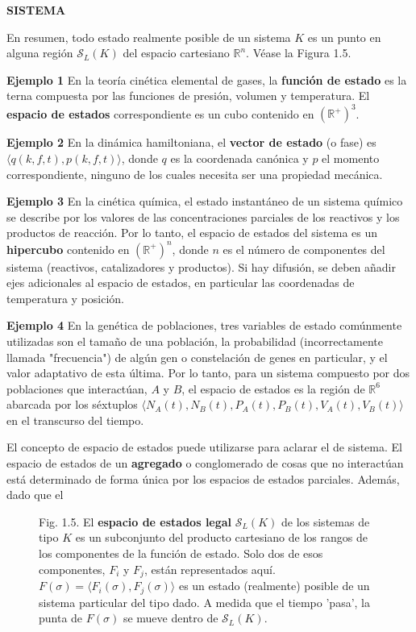 \fancyhf{}
\fancyhead[r]{\thepage}
\begin{center}
{\fontsize{16}{18}\selectfont \textbf{SISTEMA}}
\end{center}
\vspace{0.5cm}

{\fontsize{13}{15}\selectfont
En resumen, todo estado realmente posible de un sistema $K$ es un punto en alguna región $\mathcal{S}_L(K)$ del espacio cartesiano $\mathbb{R}^n$. Véase la Figura 1.5.

\textbf{Ejemplo 1} En la teoría cinética elemental de gases, la \textbf{función de estado} es la terna compuesta por las funciones de presión, volumen y temperatura. El \textbf{espacio de estados} correspondiente es un cubo contenido en $(\mathbb{R}^+)^3$.

\textbf{Ejemplo 2} En la dinámica hamiltoniana, el \textbf{vector de estado} (o fase) es $\langle q(k, f, t), p(k, f, t) \rangle$, donde $q$ es la coordenada canónica y $p$ el momento correspondiente, ninguno de los cuales necesita ser una propiedad mecánica.

\textbf{Ejemplo 3} En la cinética química, el estado instantáneo de un sistema químico se describe por los valores de las concentraciones parciales de los reactivos y los productos de reacción. Por lo tanto, el espacio de estados del sistema es un \textbf{hipercubo} contenido en $(\mathbb{R}^+)^n$, donde $n$ es el número de componentes del sistema (reactivos, catalizadores y productos). Si hay difusión, se deben añadir ejes adicionales al espacio de estados, en particular las coordenadas de temperatura y posición.

\textbf{Ejemplo 4} En la genética de poblaciones, tres variables de estado comúnmente utilizadas son el tamaño de una población, la probabilidad (incorrectamente llamada "frecuencia") de algún gen o constelación de genes en particular, y el valor adaptativo de esta última. Por lo tanto, para un sistema compuesto por dos poblaciones que interactúan, $A$ y $B$, el espacio de estados es la región de $\mathbb{R}^6$ abarcada por los séxtuplos $\langle N_A(t), N_B(t), P_A(t), P_B(t), V_A(t), V_B(t) \rangle$ en el transcurso del tiempo.

El concepto de espacio de estados puede utilizarse para aclarar el de sistema. El espacio de estados de un \textbf{agregado} o conglomerado de cosas que no interactúan está determinado de forma única por los espacios de estados parciales. Además, dado que el

\begin{figure}[h!]
    \centering
    \caption*{Fig. 1.5. El \textbf{espacio de estados legal} $\mathcal{S}_L(K)$ de los sistemas de tipo $K$ es un subconjunto del producto cartesiano de los rangos de los componentes de la función de estado. Solo dos de esos componentes, $F_i$ y $F_j$, están representados aquí. $F(\sigma) = \langle F_i(\sigma), F_j(\sigma) \rangle$ es un estado (realmente) posible de un sistema particular del tipo dado. A medida que el tiempo 'pasa', la punta de $F(\sigma)$ se mueve dentro de $\mathcal{S}_L(K)$.}
\end{figure}
}
